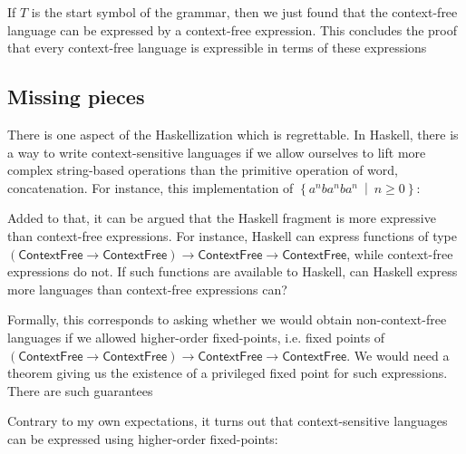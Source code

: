 If $T$ is the start symbol of the grammar, then we just found that the context-free language can be expressed by a context-free expression. This concludes the proof that every context-free language is expressible in terms of these expressions


\subsection{Missing pieces}

There is one aspect of the Haskellization which is regrettable. In Haskell, there is a way to write context-sensitive languages if we allow ourselves to lift more complex string-based operations than the primitive operation of word, concatenation. For instance, this implementation of $\left\lbrace a^nba^nba^n\ \middle|\ n\geq 0\right\rbrace$:



Added to that, it can be argued that the Haskell fragment is more expressive than context-free expressions. For instance, Haskell can express functions of type $(\textsf{ContextFree}\rightarrow \textsf{ContextFree})\rightarrow  \textsf{ContextFree}\rightarrow \textsf{ContextFree}$, while context-free expressions do not. If such functions are available to Haskell, can Haskell express more languages than context-free expressions can? 

Formally, this corresponds to asking whether we would obtain non-context-free languages if we allowed higher-order fixed-points, i.e. fixed points of $(\textsf{ContextFree}\rightarrow \textsf{ContextFree})\rightarrow  \textsf{ContextFree}\rightarrow \textsf{ContextFree}$. We would need a theorem giving us the existence of a privileged fixed point for such expressions. There are such guarantees

Contrary to my own expectations, it turns out that context-sensitive languages can be expressed using higher-order fixed-points:





